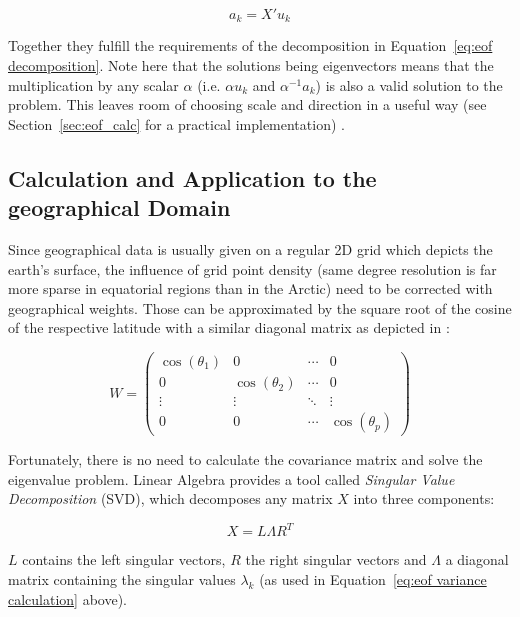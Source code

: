 \begin{equation}
  a_{k} = X'u_k
\end{equation}

Together they fulfill the requirements of the decomposition in Equation~\ref{eq:eof decomposition}. 
Note here that the solutions being eigenvectors means that the multiplication by any scalar $\alpha$ (i.e. $\alpha u_k$ and $\alpha^{-1} a_k$) is also a valid solution to the problem. 
This leaves room of choosing scale and direction in a useful way (see Section~\ref{sec:eof_calc} for a practical implementation) \cite{vietinghoffdiss}. 

\subsection{Calculation and Application to the geographical Domain}


Since geographical data is usually given on a regular 2D grid which depicts the earth's surface, the influence of grid point density (same degree resolution is far more sparse in equatorial regions than in the Arctic) need to be corrected with geographical weights. 
Those can be approximated by the square root of the cosine of the respective latitude \cite{hannachi_primer_nodate, vietinghoffdiss} with a similar diagonal matrix as depicted in \cite{hannachi_primer_nodate}: 

\begin{equation}
  W = \begin{pmatrix}
    \cos(\theta_1) & 0 & \cdots & 0 \\
0 & \cos(\theta_2) & \cdots & 0 \\
\vdots & \vdots & \ddots & \vdots \\
0 & 0 & \cdots & \cos(\theta_p)
\end{pmatrix}
  \label{eq:geographical weighting}
\end{equation}
  

Fortunately, there is no need to calculate the covariance matrix and solve the eigenvalue problem. 
Linear Algebra provides a tool called \textit{Singular Value Decomposition} (SVD), which decomposes any matrix $X$ into three components: 

\begin{equation}
  X = L \Lambda R^T 
  \label{eq:svd definition}
\end{equation}

$L$ contains the left singular vectors, $R$ the right singular vectors and $\Lambda$ a diagonal matrix containing the singular values $\lambda_k$ (as used in Equation~\ref{eq:eof variance calculation} above). 

